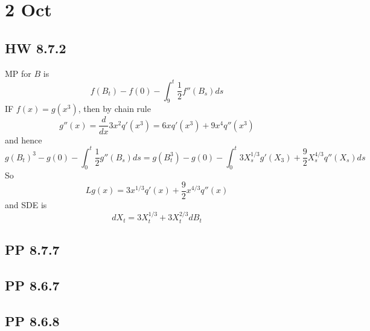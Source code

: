 \documentclass[11pt]{article}
\begin{document}
\section{2 Oct}
\subsection{HW 8.7.2}
MP for $B$ is 
\[
    f(B_t) - f(0) - \int_9^t \frac{1}{2} f''(B_s) ds 
\]
IF $f(x) = g(x^3)$, then by chain rule
\[
    g''(x) = \frac{d}{dx}3x^2 q'(x^3) = 6xq'(x^3) + 9x^4 q''(x^3)    
\]
and hence
\[
    g(B_t)^3 - g(0) - \int_0^t \frac{1}{2} g''(B_s)ds = g(B_t^3)  - g(0) - \int_0^t 3X_s^{1/3} g'(X_3) + \frac{9}{2} X_s^{4/3}q''(X_s)ds
\] 
So 
\[
    Lg(x) = 3x^{1/3}q'(x) + \frac{9}{2}x^{4/3} q''(x)    
\]
and SDE is 
\[
    dX_t = 3X_t^{1/3} + 3X_t^{2/3} dB_t    
\]
\subsection{PP 8.7.7}
\subsection{PP 8.6.7}
\subsection{PP 8.6.8}
\end{document}
